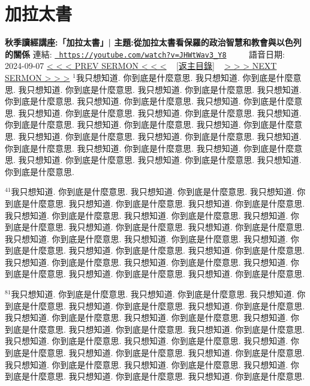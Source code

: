 \documentclass{book}
\begin{document}
\section{加拉太書}
\label{sec:JHWtWav3_Y8}
\textbf{秋季讀經講座:「加拉太書」| 主題:從加拉太書看保羅的政治智慧和教會與以色列的關係}
\newline
\newline
連結: \href{https://youtube.com/watch?v=JHWtWav3_Y8}{\texttt{ https://youtube.com/watch?v=JHWtWav3\_Y8}} ~~~~ 語音日期: 2024-09-07 
\newline
\newline
\hyperref[sec:I0XYkK_j_N0]{\small{< < < PREV SERMON < < <}}
~
\hyperref[sec:index]{\small{[返主目錄]}}
~
\hyperref[sec:code]{\small{> > > NEXT SERMON > > >}}
\newline
\newline
$^{1}$我只想知道.
你到底是什麼意思.
我只想知道.
你到底是什麼意思.
我只想知道.
你到底是什麼意思.
我只想知道.
你到底是什麼意思.
我只想知道.
你到底是什麼意思.
我只想知道.
你到底是什麼意思.
我只想知道.
你到底是什麼意思.
我只想知道.
你到底是什麼意思.
我只想知道.
你到底是什麼意思.
我只想知道.
你到底是什麼意思.
我只想知道.
你到底是什麼意思.
我只想知道.
你到底是什麼意思.
我只想知道.
你到底是什麼意思.
我只想知道.
你到底是什麼意思.
我只想知道.
你到底是什麼意思.
我只想知道.
你到底是什麼意思.
我只想知道.
你到底是什麼意思.
我只想知道.
你到底是什麼意思.
我只想知道.
你到底是什麼意思.
我只想知道.
你到底是什麼意思.

$^{41}$我只想知道.
你到底是什麼意思.
我只想知道.
你到底是什麼意思.
我只想知道.
你到底是什麼意思.
我只想知道.
你到底是什麼意思.
我只想知道.
你到底是什麼意思.
我只想知道.
你到底是什麼意思.
我只想知道.
你到底是什麼意思.
我只想知道.
你到底是什麼意思.
我只想知道.
你到底是什麼意思.
我只想知道.
你到底是什麼意思.
我只想知道.
你到底是什麼意思.
我只想知道.
你到底是什麼意思.
我只想知道.
你到底是什麼意思.
我只想知道.
你到底是什麼意思.
我只想知道.
你到底是什麼意思.
我只想知道.
你到底是什麼意思.
我只想知道.
你到底是什麼意思.
我只想知道.
你到底是什麼意思.
我只想知道.
你到底是什麼意思.
我只想知道.
你到底是什麼意思.

$^{81}$我只想知道.
你到底是什麼意思.
我只想知道.
你到底是什麼意思.
我只想知道.
你到底是什麼意思.
我只想知道.
你到底是什麼意思.
我只想知道.
你到底是什麼意思.
我只想知道.
你到底是什麼意思.
我只想知道.
你到底是什麼意思.
我只想知道.
你到底是什麼意思.
我只想知道.
你到底是什麼意思.
我只想知道.
你到底是什麼意思.
我只想知道.
你到底是什麼意思.
我只想知道.
你到底是什麼意思.
我只想知道.
你到底是什麼意思.
我只想知道.
你到底是什麼意思.
我只想知道.
你到底是什麼意思.
我只想知道.
你到底是什麼意思.
我只想知道.
你到底是什麼意思.
我只想知道.
你到底是什麼意思.
我只想知道.
你到底是什麼意思.
我只想知道.
你到底是什麼意思.
\end{document}
